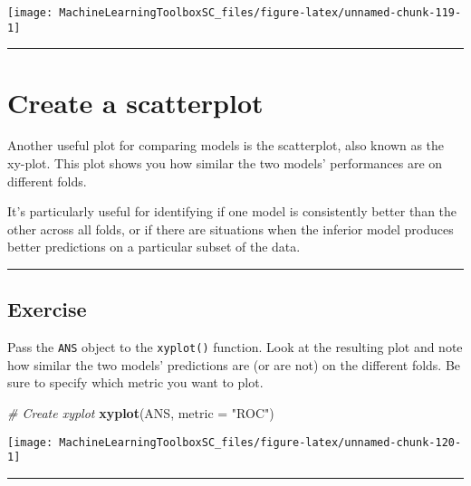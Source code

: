 \documentclass[]{book}
\newenvironment{Shaded}{\begin{snugshade}}{\end{snugshade}}
\newcommand{\KeywordTok}[1]{\textcolor[rgb]{0.13,0.29,0.53}{\textbf{#1}}}
\newcommand{\DataTypeTok}[1]{\textcolor[rgb]{0.13,0.29,0.53}{#1}}
\newcommand{\StringTok}[1]{\textcolor[rgb]{0.31,0.60,0.02}{#1}}
\newcommand{\CommentTok}[1]{\textcolor[rgb]{0.56,0.35,0.01}{\textit{#1}}}
\newcommand{\NormalTok}[1]{#1}
\begin{document}
\begin{center}\texttt{[image: MachineLearningToolboxSC\_files/figure-latex/unnamed-chunk-119-1]} \end{center}

\begin{center}\rule{0.5\linewidth}{\linethickness}\end{center}

\section{Create a scatterplot}\label{create-a-scatterplot}

Another useful plot for comparing models is the scatterplot, also known
as the xy-plot. This plot shows you how similar the two models'
performances are on different folds.

It's particularly useful for identifying if one model is consistently
better than the other across all folds, or if there are situations when
the inferior model produces better predictions on a particular subset of
the data.

\begin{center}\rule{0.5\linewidth}{\linethickness}\end{center}

\subsection{Exercise}\label{exercise-34}

Pass the \texttt{ANS} object to the \texttt{xyplot()} function. Look at
the resulting plot and note how similar the two models' predictions are
(or are not) on the different folds. Be sure to specify which metric you
want to plot.

\begin{Shaded}
\begin{Highlighting}[]
\CommentTok{# Create xyplot}
\KeywordTok{xyplot}\NormalTok{(ANS, }\DataTypeTok{metric =} \StringTok{"ROC"}\NormalTok{)}
\end{Highlighting}
\end{Shaded}

\begin{center}\texttt{[image: MachineLearningToolboxSC\_files/figure-latex/unnamed-chunk-120-1]} \end{center}

\begin{center}\rule{0.5\linewidth}{\linethickness}\end{center}
\end{document}
